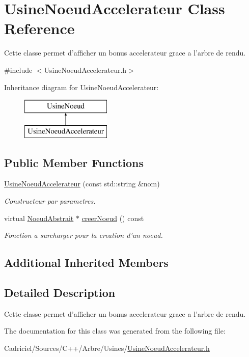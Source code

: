 \hypertarget{class_usine_noeud_accelerateur}{\section{Usine\-Noeud\-Accelerateur Class Reference}
\label{class_usine_noeud_accelerateur}
}


Cette classe permet d'afficher un bonus accelerateur grace a l'arbre de rendu.  




{\ttfamily \#include $<$Usine\-Noeud\-Accelerateur.\-h$>$}

Inheritance diagram for Usine\-Noeud\-Accelerateur\-:\begin{figure}[H]
\begin{center}
\leavevmode
\includegraphics[height=2.000000cm]{class_usine_noeud_accelerateur}
\end{center}
\end{figure}
\subsection*{Public Member Functions}
\begin{DoxyCompactItemize}
\item 
\hyperlink{group__inf2990_ga2738f2b5f1c5816f359695824167ae83}{Usine\-Noeud\-Accelerateur} (const std\-::string \&nom)
\begin{DoxyCompactList}\small\item\em Constructeur par parametres. \end{DoxyCompactList}\item 
virtual \hyperlink{class_noeud_abstrait}{Noeud\-Abstrait} $\ast$ \hyperlink{group__inf2990_gac930b86cf1f3e8861f6b8af11df2c8cb}{creer\-Noeud} () const 
\begin{DoxyCompactList}\small\item\em Fonction a surcharger pour la creation d'un noeud. \end{DoxyCompactList}\end{DoxyCompactItemize}
\subsection*{Additional Inherited Members}


\subsection{Detailed Description}
Cette classe permet d'afficher un bonus accelerateur grace a l'arbre de rendu. 

The documentation for this class was generated from the following file\-:\begin{DoxyCompactItemize}
\item 
Cadriciel/\-Sources/\-C++/\-Arbre/\-Usines/\hyperlink{_usine_noeud_accelerateur_8h}{Usine\-Noeud\-Accelerateur.\-h}\end{DoxyCompactItemize}
